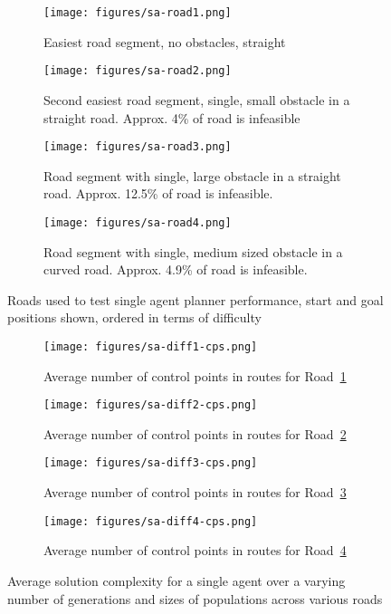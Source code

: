 \begin{figure}
  \centering
  \begin{subfigure}[b]{0.44\textwidth}
    \centering
    \texttt{[image: figures/sa-road1.png]}
    \caption{\label{subfig:sa-road1}Easiest road segment, no obstacles, straight}
  \end{subfigure}
  \begin{subfigure}[b]{0.44\textwidth}
    \centering
    \texttt{[image: figures/sa-road2.png]}
    \caption{\label{subfig:sa-road2}Second easiest road segment, single, small obstacle in a straight road. Approx. 4\% of road is infeasible}
  \end{subfigure}
  \begin{subfigure}[b]{0.44\textwidth}
    \centering
    \texttt{[image: figures/sa-road3.png]}
    \caption{\label{subfig:sa-road3}Road segment with single, large obstacle in a straight road. Approx. 12.5\% of road is infeasible.}
  \end{subfigure}
  \begin{subfigure}[b]{0.44\textwidth}
    \centering
    \texttt{[image: figures/sa-road4.png]}
    \caption{\label{subfig:sa-road4}Road segment with single, medium sized obstacle in a curved road. Approx. 4.9\% of road is infeasible.}
  \end{subfigure}
  \caption{\label{fig:single-agent-roads} Roads used to test single agent planner performance, start and goal positions shown, ordered in terms of difficulty}
\end{figure}

\begin{figure}
  \centering
  \begin{subfigure}[b]{0.44\textwidth}
    \centering
    \texttt{[image: figures/sa-diff1-cps.png]}
    \caption{\label{subfig:sa-diff1-cps}Average number of control points in routes for Road~\ref{subfig:sa-road1}}
  \end{subfigure}
  \begin{subfigure}[b]{0.44\textwidth}
    \centering
    \texttt{[image: figures/sa-diff2-cps.png]}
    \caption{\label{subfig:sa-diff2-cps}Average number of control points in routes for Road~\ref{subfig:sa-road2}}
  \end{subfigure}
  \begin{subfigure}[b]{0.44\textwidth}
    \centering
    \texttt{[image: figures/sa-diff3-cps.png]}
    \caption{\label{subfig:sa-diff3-cps}Average number of control points in routes for Road~\ref{subfig:sa-road3}}
  \end{subfigure}
  \begin{subfigure}[b]{0.44\textwidth}
    \centering
    \texttt{[image: figures/sa-diff4-cps.png]}
    \caption{\label{subfig:sa-diff4-cps}Average number of control points in routes for Road~\ref{subfig:sa-road4}}
  \end{subfigure}
  \caption{\label{fig:single-agent-cps} Average solution complexity for a single agent over a varying number of generations and sizes of populations across various roads }
\end{figure}


